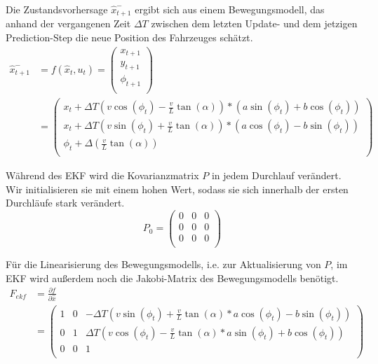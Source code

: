 \documentclass[11pt]{article}
\begin{document}
Die Zustandsvorhersage $\hat{x}_{t+1}^-$ ergibt sich aus einem Bewegungsmodell, das anhand der vergangenen Zeit $\Delta T$ zwischen dem letzten Update- und dem jetzigen Prediction-Step die neue Position des Fahrzeuges schätzt. 
\begin{equation}\label{EKF-Motion-Model}
\begin{split}
	\hat{x}_{t+1}^- &= f(\hat{x}_{t},u_t) = \begin{pmatrix}
		x_{t+1} \\
		y_{t+1} \\
		\phi_{t+1} \\
	  \end{pmatrix} \\
	  &= \begin{pmatrix}
		  x_{t}+\Delta T(v\cos(\phi_t)-\frac{v}{L}\tan(\alpha))*(a\sin(\phi_t)+b\cos(\phi_t)) \\
		  x_{t}+\Delta T(v\sin(\phi_t)+\frac{v}{L}\tan(\alpha))*(a\cos(\phi_t)-b\sin(\phi_t)) \\
		  \phi_t + \Delta(\frac{v}{L}\tan(\alpha)) \\
	  \end{pmatrix}
\end{split}
\end{equation}

Während des EKF wird die Kovarianzmatrix $P$ in jedem Durchlauf verändert. Wir initialisieren sie mit einem hohen Wert, sodass sie sich innerhalb der ersten Durchläufe stark verändert. 
\begin{equation}\label{EKF-Initiale-Kovarianzmatrix}
	P_{0} = \begin{pmatrix}
		0 & 0 & 0 \\
		0 & 0 & 0 \\
		0 & 0 & 0 \\
	  \end{pmatrix}
\end{equation}

Für die Linearisierung des Bewegungsmodells, i.e. zur Aktualisierung von $P$, im EKF wird außerdem noch die Jakobi-Matrix des Bewegungsmodells benötigt.
\begin{equation}\label{EKF-Motion-Model-Jakobi-Matrix}
\begin{split}
	F_{ekf} &= \frac{\partial f}{\partial \hat{x}} \\
	&= \begin{pmatrix}
		1 & 0 & -\Delta T(v\sin(\phi_t)+\frac{v}{L}\tan(\alpha)*a\cos(\phi_t)-b\sin(\phi_t)) \\
		0 & 1 & \Delta T(v\cos(\phi_t)-\frac{v}{L}\tan(\alpha)*a\sin(\phi_t)+b\cos(\phi_t)) \\
		0 & 0 & 1 \\
	  \end{pmatrix}
\end{split}
\end{equation}
\end{document}
